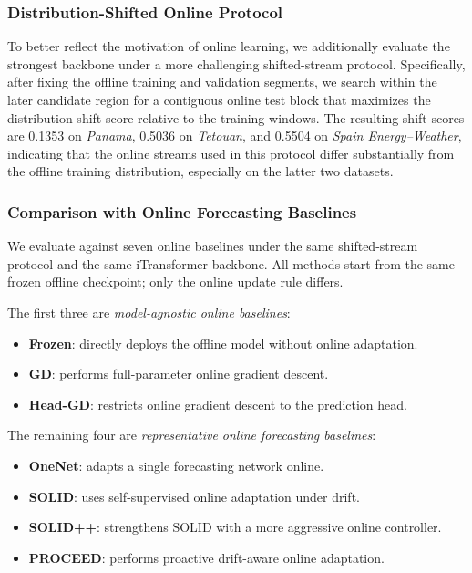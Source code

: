 ﻿\documentclass[journal]{IEEEtran}
\begin{document}
\subsubsection{Distribution-Shifted Online Protocol}
To better reflect the motivation of online learning, we additionally evaluate the strongest backbone under a more challenging shifted-stream protocol. Specifically, after fixing the offline training and validation segments, we search within the later candidate region for a contiguous online test block that maximizes the distribution-shift score relative to the training windows. The resulting shift scores are 0.1353 on \textit{Panama}, 0.5036 on \textit{Tetouan}, and 0.5504 on \textit{Spain Energy--Weather}, indicating that the online streams used in this protocol differ substantially from the offline training distribution, especially on the latter two datasets.

\subsubsection{Comparison with Online Forecasting Baselines}
We evaluate against seven online baselines under the same shifted-stream protocol and the same iTransformer backbone. All methods start from the same frozen offline checkpoint; only the online update rule differs.

The first three are \emph{model-agnostic online baselines}:
\begin{itemize}
\item \textbf{Frozen}: directly deploys the offline model without online adaptation.
\item \textbf{GD}: performs full-parameter online gradient descent.
\item \textbf{Head-GD}: restricts online gradient descent to the prediction head.
\end{itemize}

The remaining four are \emph{representative online forecasting baselines}:
\begin{itemize}
\item \textbf{OneNet}: adapts a single forecasting network online.
\item \textbf{SOLID}: uses self-supervised online adaptation under drift.
\item \textbf{SOLID++}: strengthens SOLID with a more aggressive online controller.
\item \textbf{PROCEED}: performs proactive drift-aware online adaptation.
\end{itemize}
\end{document}
